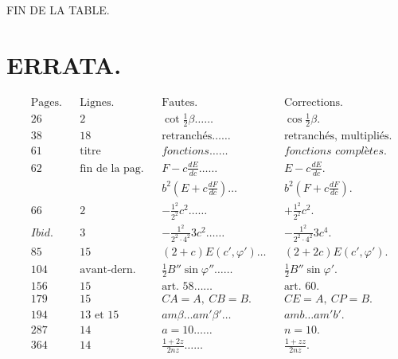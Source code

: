 \documentclass{article}
\begin{document}
FIN DE LA TABLE.


\section*{ERRATA.}

\[
\begin{aligned}
&\text{Pages.} && \text{Lignes.} && \text{Fautes.} && \text{Corrections.}\\
&26 && 2 && \cot\tfrac{1}{2}\beta\ldots\ldots && \cos\tfrac{1}{2}\beta.\\
&38 && 18 && \text{retranchés}\ldots\ldots && \text{retranchés, multipliés.}\\
&61 && \text{titre} && \textit{fonctions}\ldots\ldots && \textit{fonctions complètes.}\\
&62 && \text{fin de la pag.} && F-c\frac{dE}{dc}\ldots\ldots && E-c\frac{dE}{dc}.\\
& && && b^{2}\left(E+c\frac{dF}{dc}\right)\ldots && b^{2}\left(F+c\frac{dF}{dc}\right).\\
&66 && 2 && -\frac{1^{2}}{2^{2}}c^{2}\ldots\ldots && +\frac{1^{2}}{2^{2}}c^{2}.\\
&\textit{Ibid.} && 3 && -\frac{1^{2}}{2^{2}\cdot4^{2}}3c^{2}\ldots\ldots && -\frac{1^{2}}{2^{2}\cdot4^{2}}3c^{4}.\\
&85 && 15 && (2+c)E(c',\varphi')\ldots && (2+2c)E(c',\varphi').\\
&104 && \text{avant-dern.} && \tfrac{1}{2}B''\sin\varphi''\ldots\ldots && \tfrac{1}{2}B''\sin\varphi'.\\
&156 && 15 && \text{art.\ 58}\ldots\ldots && \text{art.\ 60.}\\
&179 && 15 && CA=A,\ CB=B. && CE=A,\ CP=B.\\
&194 && \text{13 et 15} && am\beta\ldots am'\beta'\ldots && amb\ldots am'b'.\\
&287 && 14 && a=10\ldots\ldots && n=10.\\
&364 && 14 && \frac{1+2z}{2nz}\ldots\ldots && \frac{1+zz}{2nz}.
\end{aligned}
\]
\end{document}
